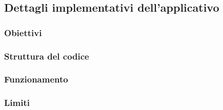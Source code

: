 \subsection{Dettagli implementativi dell'applicativo}
\subsubsection{Obiettivi}

\subsubsection{Struttura del codice}

\subsubsection{Funzionamento}

\subsubsection{Limiti}
